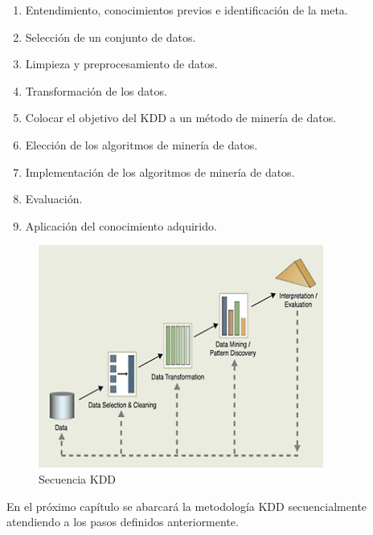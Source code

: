   \begin{enumerate}
  	\item Entendimiento, conocimientos previos e identificaci\'{o}n de la meta.
  	\item Selecci\'{o}n de un conjunto de datos.
  	\item Limpieza y preprocesamiento de datos.
  	\item Transformaci\'{o}n de los datos.
  	\item Colocar el objetivo del KDD a un m\'{e}todo de miner\'{i}a de datos.
  	\item Elecci\'{o}n de los algoritmos de miner\'{i}a de datos.
  	\item Implementaci\'{o}n de los algoritmos de miner\'{i}a de datos.
  	\item Evaluaci\'{o}n.
  	\item Aplicaci\'{o}n del conocimiento adquirido.
  \end{enumerate}

\begin{figure}[h!]
	\centering
	\includegraphics[height=0.5\textheight]{"figuras/Fig3"}
	\caption{Secuencia KDD}
\end{figure}

  En el pr\'{o}ximo cap\'{i}tulo se abarcar\'{a} la metodolog\'{i}a KDD secuencialmente atendiendo a los pasos definidos anteriormente.